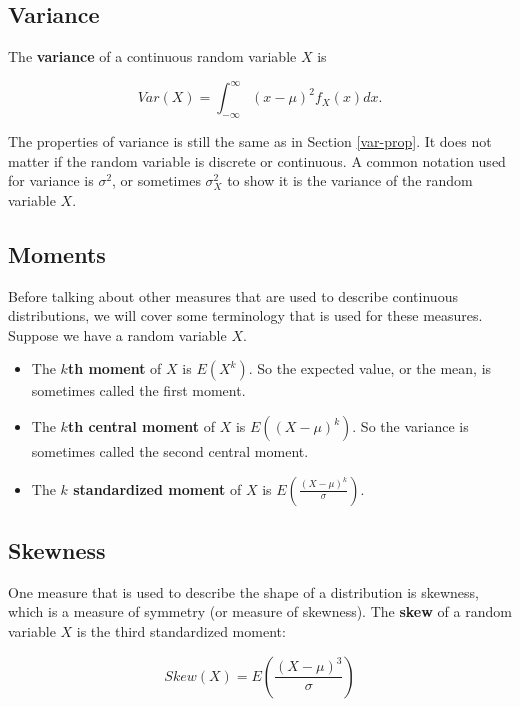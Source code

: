\documentclass[
]{book}
\providecommand{\tightlist}{%
  \setlength{\itemsep}{0pt}\setlength{\parskip}{0pt}}
\begin{document}
\hypertarget{variance-1}{%
\subsection{Variance}\label{variance-1}}

The \textbf{variance} of a continuous random variable \(X\) is

\begin{equation} 
Var(X) = \int_{-\infty}^{\infty} (x-\mu)^2 f_X(x) dx.
\label{eq:4-var}
\end{equation}

The properties of variance is still the same as in Section \ref{var-prop}. It does not matter if the random variable is discrete or continuous. A common notation used for variance is \(\sigma^2\), or sometimes \(\sigma_X^2\) to show it is the variance of the random variable \(X\).

\hypertarget{moments}{%
\subsection{Moments}\label{moments}}

Before talking about other measures that are used to describe continuous distributions, we will cover some terminology that is used for these measures. Suppose we have a random variable \(X\).

\begin{itemize}
\tightlist
\item
  The \textbf{\(k\)th moment} of \(X\) is \(E(X^k)\). So the expected value, or the mean, is sometimes called the first moment.
\item
  The \textbf{\(k\)th central moment} of \(X\) is \(E((X-\mu)^k)\). So the variance is sometimes called the second central moment.
\item
  The \textbf{\(k\) standardized moment} of \(X\) is \(E(\frac{(X-\mu)^k}{\sigma})\).
\end{itemize}

\hypertarget{skewness}{%
\subsection{Skewness}\label{skewness}}

One measure that is used to describe the shape of a distribution is skewness, which is a measure of symmetry (or measure of skewness). The \textbf{skew} of a random variable \(X\) is the third standardized moment:

\begin{equation} 
Skew(X) = E \left(\frac{(X-\mu)^3}{\sigma} \right)
\label{eq:4-skew}
\end{equation}
\end{document}
